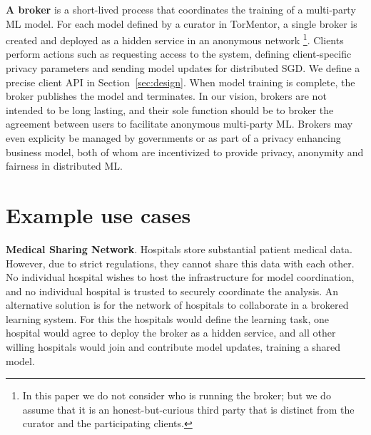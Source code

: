 
\textbf{A broker} is a short-lived process that coordinates the
training of a multi-party ML model. For each model defined by a
curator in TorMentor, a single broker is created and deployed as a
hidden service in an anonymous network \footnote{In this paper we do not
  consider who is running the broker; but we do assume that it is
  an honest-but-curious third party that is distinct from the
  curator and the participating clients.}.
%
Clients perform actions such as requesting access to the system, defining
client-specific privacy parameters and sending model updates for
distributed SGD. We define a precise client \ac{API} in 
Section~\ref{sec:design}. When model training is complete, the broker
publishes the model and terminates. In our vision, brokers are not
intended to be long lasting, and their sole function should be to
broker the agreement between users to facilitate anonymous multi-party
ML. Brokers may even explicity be managed by governments or as part of
a privacy enhancing business model, both of whom are incentivized to
provide privacy, anonymity and fairness in distributed ML.


\section{Example use cases}

\noindent \textbf{Medical Sharing Network}. Hospitals store substantial
patient medical data. However, due to strict regulations, they 
cannot share this data with each other. No individual
hospital wishes to host the infrastructure for model coordination, and
no individual hospital is trusted to securely coordinate the analysis.
An alternative solution is for the network of hospitals to collaborate in
a brokered learning system. For this the hospitals would define the
learning task, one hospital would agree to deploy the broker as a
hidden service, and all other willing hospitals would join and
contribute model updates, training a shared model. \\

